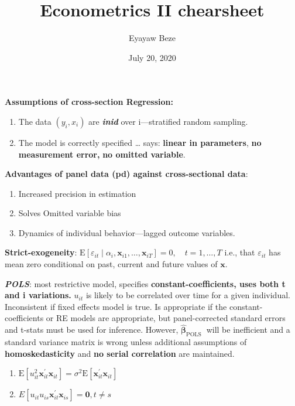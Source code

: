 \documentclass[
]{article}
\title{Econometrics II chearsheet}
\author{Eyayaw Beze}
\date{July 20, 2020}
\providecommand{\tightlist}{%
  \setlength{\itemsep}{0pt}\setlength{\parskip}{0pt}}
\begin{document}
\maketitle

\textbf{Assumptions of cross-section Regression:}

\begin{enumerate}
\def\labelenumi{(\arabic{enumi})}
\tightlist
\item
  The data \((y_i, x_i)\) are \textbf{\emph{inid}} over i---stratified
  random sampling.
\item
  The model is correctly specified \ldots{} says: \textbf{linear in
  parameters}, \textbf{no measurement error,} \textbf{no omitted
  variable}.
\end{enumerate}

\textbf{Advantages of panel data (pd) against cross-sectional data}:

\begin{enumerate}
\def\labelenumi{\arabic{enumi}.}
\tightlist
\item
  Increased precision in estimation
\item
  Solves Omitted variable bias
\item
  Dynamics of individual behavior---lagged outcome variables.\\
\end{enumerate}

\textbf{Strict-exogeneity}:
\(\mathrm{E}\left[\varepsilon_{i t} \mid \alpha_{i}, \mathbf{x}_{i 1}, \ldots, \mathbf{x}_{i T}\right]=0, \quad t=1, \ldots, T\)
i.e., that \(\varepsilon_{i t}\) has mean zero conditional on past,
current and future values of \(\mathbf{x}\).

\textbf{\emph{POLS}}: most restrictive model, specifies
\textbf{constant-coefficients, uses both t and i variations.} \(u_{it}\)
is likely to be correlated over time for a given individual.
Inconsistent if fixed effects model is true. Is appropriate if the
constant-coefficients or RE models are appropriate, but panel-corrected
standard errors and t-stats must be used for inference. However,
\(\boldsymbol{\hat\beta}_{\text {POLS }}\) will be inefficient and a
standard variance matrix is wrong unless additional assumptions of
\textbf{homoskedasticity} and \textbf{no serial correlation} are
maintained.

\begin{enumerate}
\def\labelenumi{(\alph{enumi})}
\item
  \(\mathrm{E}\left[u_{i t}^{2} \mathbf{x}_{i t}^{\prime} \mathbf{x}_{i t}\right]=\sigma^{2} \mathrm{E}\left[\mathbf{x}_{i t}^{\prime} \mathbf{x}_{i t}\right]\)
\item
  \(E\left[u_{i t} u_{i s} \mathbf{x}_{i t}^{\prime} \mathbf{x}_{i s}\right]=\mathbf{0}, t \neq s\)\\
\end{enumerate}
\end{document}
